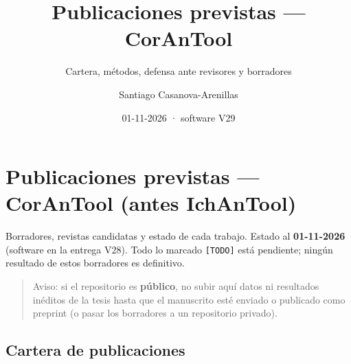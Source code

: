 \documentclass[
  10pt,
]{article}
\title{Publicaciones previstas --- CorAnTool}
\subtitle{Cartera, métodos, defensa ante revisores y borradores}
\author{Santiago Casanova-Arenillas}
\date{01-11-2026 · software V29}
\begin{document}
\maketitle

{
\hypersetup{linkcolor=}
\setcounter{tocdepth}{2}
\tableofcontents
}
\hypertarget{publicaciones-previstas-corantool-antes-ichantool}{%
\section{Publicaciones previstas --- CorAnTool (antes
IchAnTool)}\label{publicaciones-previstas-corantool-antes-ichantool}}

Borradores, revistas candidatas y estado de cada trabajo. Estado al
\textbf{01-11-2026} (software en la entrega V28). Todo lo marcado
\texttt{{[}TODO{]}} está pendiente; ningún resultado de estos borradores
es definitivo.

\begin{quote}
Aviso: si el repositorio es \textbf{público}, no subir aquí datos ni
resultados inéditos de la tesis hasta que el manuscrito esté enviado o
publicado como preprint (o pasar los borradores a un repositorio
privado).
\end{quote}

\hypertarget{cartera-de-publicaciones}{%
\subsection{Cartera de publicaciones}\label{cartera-de-publicaciones}}
\end{document}
